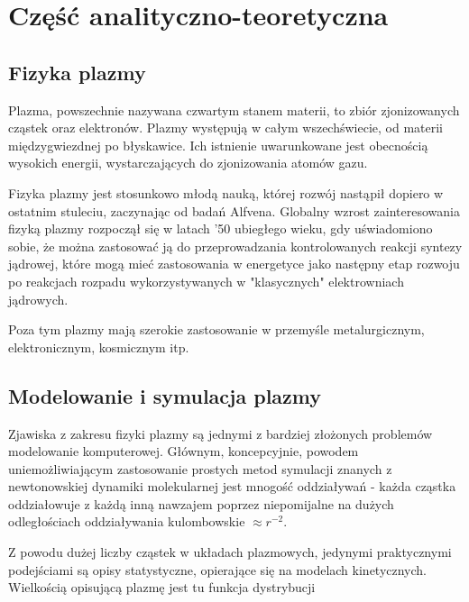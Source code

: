 \section{Część analityczno-teoretyczna} %

\subsection{Fizyka plazmy}

Plazma, powszechnie nazywana czwartym stanem materii, to zbiór zjonizowanych %
cząstek oraz elektronów. Plazmy występują w całym wszechświecie, od materii międzygwiezdnej po błyskawice.
Ich istnienie uwarunkowane jest obecnością wysokich energii, wystarczających do zjonizowania atomów gazu.

Fizyka plazmy jest stosunkowo młodą nauką, której rozwój nastąpił dopiero w ostatnim stuleciu, zaczynając od badań Alfvena. %
Globalny wzrost zainteresowania fizyką plazmy rozpoczął się w latach '50 ubiegłego wieku, %
gdy uświadomiono sobie, że można zastosować ją do przeprowadzania kontrolowanych reakcji syntezy jądrowej, %
które mogą mieć zastosowania w energetyce jako następny etap rozwoju po reakcjach rozpadu wykorzystywanych
w "klasycznych" elektrowniach jądrowych.

Poza tym plazmy mają szerokie zastosowanie w przemyśle metalurgicznym, elektronicznym, kosmicznym itp. %

\subsection{Modelowanie i symulacja plazmy}

Zjawiska z zakresu fizyki plazmy są jednymi z bardziej złożonych problemów modelowanie komputerowej.
Głównym, koncepcyjnie, powodem uniemożliwiającym zastosowanie prostych metod symulacji
znanych z newtonowskiej dynamiki molekularnej jest mnogość oddziaływań - każda cząstka oddziałowuje
z każdą inną nawzajem poprzez niepomijalne na dużych odległościach oddziaływania kulombowskie $\approx r^{-2}$.

Z powodu dużej liczby cząstek w układach plazmowych, jedynymi praktycznymi podejściami są opisy statystyczne, opierające się na
modelach kinetycznych. Wielkością opisującą plazmę jest tu funkcja dystrybucji

